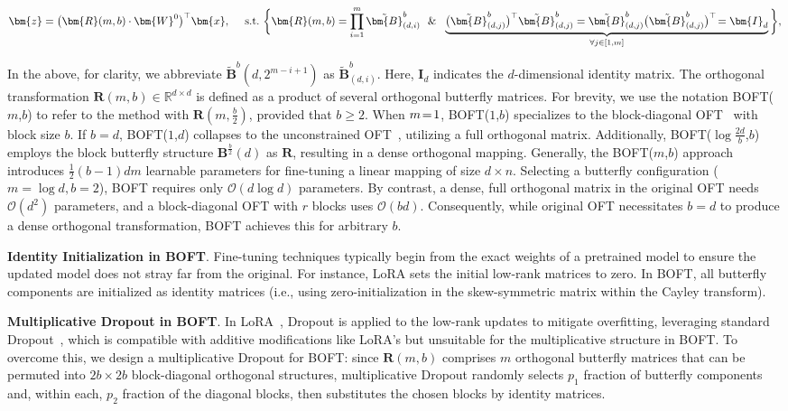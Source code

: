\begin{equation}
    \begin{aligned}\nonumber
    \bm{z}=\big(\bm{R}(m,b)\cdot\bm{W}^0\big)^\top\bm{x},~~~~\text{s.t.}~\bigg{\{}\bm{R}(m,b)=\prod_{i=1}^m \tilde{\bm{B}}^b_{(d,i)}~~\&~~\underbrace{\big(\tilde{\bm{B}}^b_{(d,j)}\big)^\top\tilde{\bm{B}}^b_{(d,j)}=\tilde{\bm{B}}^b_{(d,j)}\big(\tilde{\bm{B}}^b_{(d,j)}\big)^\top\!=\bm{I}_d}_{\forall j\in [1, m]}\bigg{\}},
    \end{aligned}
\end{equation}

In the above, for clarity, we abbreviate $\tilde{\bm{B}}^b(d,2^{m - i+1})$ as $\tilde{\bm{B}}^b_{(d,i)}$. Here, $\bm{I}_d$ indicates the $d$-dimensional identity matrix. The orthogonal transformation $\bm{R}(m,b)\in\mathbb{R}^{d\times d}$ is defined as a product of several orthogonal butterfly matrices. For brevity, we use the notation BOFT($m$,$b$) to refer to the method with $\bm{R}(m,\frac{b}{2})$, provided that $b\geq 2$. When $\thickmuskip=2mu \medmuskip=2mu m=1$, BOFT($1$,$b$) specializes to the block-diagonal OFT~\cite{qiu2023controlling} with block size $b$. If $b=d$, BOFT($1$,$d$) collapses to the unconstrained OFT~\cite{qiu2023controlling}, utilizing a full orthogonal matrix. Additionally, BOFT($\log \frac{2d}{b}$,$b$) employs the block butterfly structure $\bm{B}^{\frac{b}{2}}(d)$ as $\bm{R}$, resulting in a dense orthogonal mapping. Generally, the BOFT($m$,$b$) approach introduces $\frac{1}{2}(b-1)dm$ learnable parameters for fine-tuning a linear mapping of size $d\times n$. Selecting a butterfly configuration ($m=\log d, b=2$), BOFT requires only $\mathcal{O}(d\log d)$ parameters. By contrast, a dense, full orthogonal matrix in the original OFT needs $\mathcal{O}(d^2)$ parameters, and a block-diagonal OFT with $r$ blocks uses $\mathcal{O}(bd)$. Consequently, while original OFT necessitates $b=d$ to produce a dense orthogonal transformation, BOFT achieves this for arbitrary $b$.

\textbf{Identity Initialization in BOFT}. Fine-tuning techniques typically begin from the exact weights of a pretrained model to ensure the updated model does not stray far from the original. For instance, LoRA sets the initial low-rank matrices to zero. In BOFT, all butterfly components are initialized as identity matrices (i.e., using zero-initialization in the skew-symmetric matrix within the Cayley transform).

\textbf{Multiplicative Dropout in BOFT}. In LoRA~\cite{hulora2022}, Dropout is applied to the low-rank updates to mitigate overfitting, leveraging standard Dropout~\cite{srivastava2014dropout}, which is compatible with additive modifications like LoRA’s but unsuitable for the multiplicative structure in BOFT. To overcome this, we design a multiplicative Dropout for BOFT: since $\bm{R}(m,b)$ comprises $m$ orthogonal butterfly matrices that can be permuted into $2b\times 2b$ block-diagonal orthogonal structures, multiplicative Dropout randomly selects $p_1$ fraction of butterfly components and, within each, $p_2$ fraction of the diagonal blocks, then substitutes the chosen blocks by identity matrices.

